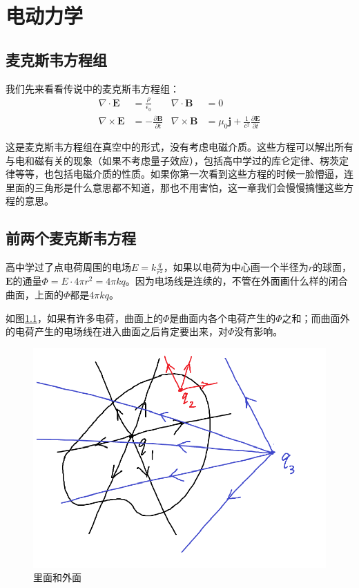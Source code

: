 \chapter{电动力学}
\section{麦克斯韦方程组}
我们先来看看传说中的麦克斯韦方程组：
\begin{align*}
\nabla \cdot \mathbf{E}&=\frac{\rho}{\epsilon_0} & \nabla \cdot \mathbf{B}&=0 \\
\nabla \times \mathbf{E}&=-\frac{\partial \mathbf{B}}{\partial t} & \nabla \times \mathbf{B}&=\mu_0 \mathbf{j}+\frac{1}{c^2} \frac{\partial \mathbf{E}}{\partial t}
\end{align*}

这是麦克斯韦方程组在真空中的形式，没有考虑电磁介质。这些方程可以解出所有与电和磁有关的现象（如果不考虑量子效应），包括高中学过的库仑定律、楞茨定律等等，也包括电磁介质的性质。如果你第一次看到这些方程的时候一脸懵逼，连里面的三角形是什么意思都不知道，那也不用害怕，这一章我们会慢慢搞懂这些方程的意思。
\section{前两个麦克斯韦方程}
高中学过了点电荷周围的电场$E=k \frac{q}{r^2}$，如果以电荷为中心画一个半径为$r$的球面，$\mathbf{E}$的通量$\Phi=E \cdot 4 \pi r^2=4 \pi k q$。因为电场线是连续的，不管在外面画什么样的闭合曲面，上面的$\Phi$都是$4 \pi k q$。

如图\ref{fig-elec-flux}，如果有许多电荷，曲面上的$\Phi$是曲面内各个电荷产生的$\Phi$之和；而曲面外的电荷产生的电场线在进入曲面之后肯定要出来，对$\Phi$没有影响。
\begin{figure}[htb]
\centering
\includegraphics[scale=0.5]{fig/elec-flux}
\caption{里面和外面}
\label{fig-elec-flux}
\end{figure}

